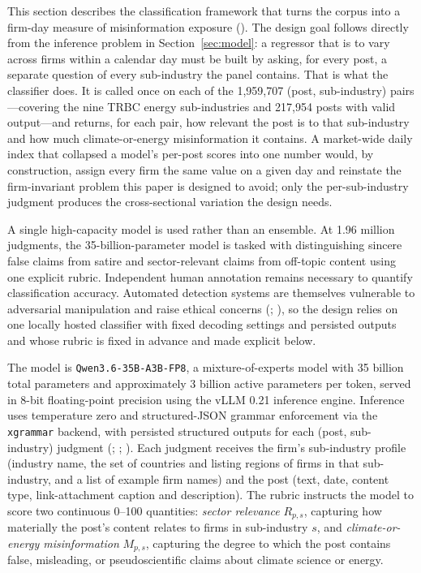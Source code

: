 \documentclass{article}
\theoremstyle{plain}
\begin{document}
This section describes the classification framework that turns the corpus into a firm-day measure of misinformation exposure (\cite{WardleDerakhshan2017}). The design goal follows directly from the inference problem in Section~\ref{sec:model}: a regressor that is to vary across firms within a calendar day must be built by asking, for every post, a separate question of every sub-industry the panel contains. That is what the classifier does. It is called once on each of the 1,959,707 (post, sub-industry) pairs---covering the nine TRBC energy sub-industries and 217,954 posts with valid output---and returns, for each pair, how relevant the post is to that sub-industry and how much climate-or-energy misinformation it contains. A market-wide daily index that collapsed a model's per-post scores into one number would, by construction, assign every firm the same value on a given day and reinstate the firm-invariant problem this paper is designed to avoid; only the per-sub-industry judgment produces the cross-sectional variation the design needs.

A single high-capacity model is used rather than an ensemble. At 1.96 million judgments, the 35-billion-parameter model is tasked with distinguishing sincere false claims from satire and sector-relevant claims from off-topic content using one explicit rubric. Independent human annotation remains necessary to quantify classification accuracy. Automated detection systems are themselves vulnerable to adversarial manipulation and raise ethical concerns (\cite{QiuLiuZhou&Huang2022}; \cite{HorneNevo&Smith2023}), so the design relies on one locally hosted classifier with fixed decoding settings and persisted outputs and whose rubric is fixed in advance and made explicit below.

The model is \texttt{Qwen3.6-35B-A3B-FP8}, a mixture-of-experts model with 35 billion total parameters and approximately 3 billion active parameters per token, served in 8-bit floating-point precision using the vLLM 0.21 inference engine. Inference uses temperature zero and structured-JSON grammar enforcement via the \texttt{xgrammar} backend, with persisted structured outputs for each (post, sub-industry) judgment (\cite{westwood2025measuring}; \cite{gilardi2023chatgpt}; \cite{santurkar2023whose}). Each judgment receives the firm's sub-industry profile (industry name, the set of countries and listing regions of firms in that sub-industry, and a list of example firm names) and the post (text, date, content type, link-attachment caption and description). The rubric instructs the model to score two continuous 0--100 quantities: \emph{sector relevance} $R_{p,s}$, capturing how materially the post's content relates to firms in sub-industry $s$, and \emph{climate-or-energy misinformation} $M_{p,s}$, capturing the degree to which the post contains false, misleading, or pseudoscientific claims about climate science or energy.
\end{document}
